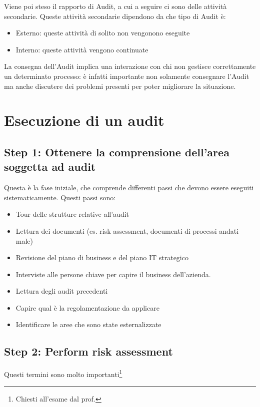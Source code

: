 Viene poi steso il rapporto di Audit, a cui a seguire ci sono delle attività 
secondarie. Queste attività secondarie dipendono da che tipo di Audit è:
\begin{itemize}
\item Esterno: queste attività di solito non vengonono eseguite
\item Interno: queste attività vengono continuate
\end{itemize}

La consegna dell'Audit implica una interazione con chi non gestisce 
correttamente un determinato processo: è infatti importante non solamente 
consegnare l'Audit ma anche discutere dei problemi presenti per poter migliorare 
la situazione.

\section{Esecuzione di un audit}

\subsection{Step 1: Ottenere la comprensione dell'area soggetta ad audit}

Questa è la fase iniziale, che comprende differenti passi che devono essere 
eseguiti sistematicamente.
Questi passi sono:
\begin{itemize} 
\item Tour delle strutture relative all'audit
\item Lettura dei documenti (es. risk assessment, documenti di processi andati 
male)
\item Revisione del piano di business e del piano IT strategico
\item Interviste alle persone chiave per capire il business dell'azienda.
\item Lettura degli audit precedenti
\item Capire qual è la regolamentazione da applicare
\item Identificare le aree che sono state esternalizzate
\end{itemize}

\subsection{Step 2: Perform risk assessment} 

Questi termini sono molto importanti\footnote{Chiesti all'esame dal prof.}

